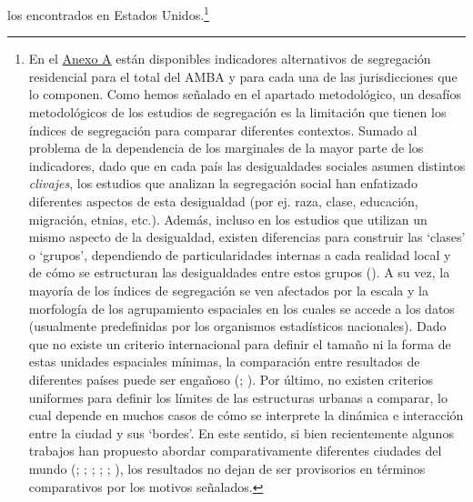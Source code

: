 \documentclass[
  spanish,
  a4paper,%
  chapterprefix=true,%
  DIV=calc,%
  twoside]{scrbook}%
\begin{document}
los encontrados en Estados Unidos.\footnote{En el \hyperref[appendixA]{Anexo A} están
  disponibles indicadores alternativos de segregación residencial para
  el total del AMBA y para cada una de las jurisdicciones que lo
  componen. Como hemos señalado en el apartado metodológico, un
  desafíos metodológicos de los estudios de segregación es la
  limitación que tienen los índices de segregación para comparar
  diferentes contextos. Sumado al problema de la dependencia de los
  marginales de la mayor parte de los indicadores, dado que en cada
  país las desigualdades sociales asumen distintos \emph{clivajes}, los
  estudios que analizan la segregación social han enfatizado
  diferentes aspectos de esta desigualdad (por ej. raza, clase,
  educación, migración, etnias, etc.). Además, incluso en los estudios
  que utilizan un mismo aspecto de la desigualdad, existen diferencias
  para construir las `clases' o `grupos', dependiendo de
  particularidades internas a cada realidad local y de cómo se
  estructuran las desigualdades entre estos grupos (). A
  su vez, la mayoría de los índices de segregación se ven afectados
  por la escala y la morfología de los agrupamiento espaciales en los
  cuales se accede a los datos (usualmente predefinidas por los
  organismos estadísticos nacionales). Dado que no existe un criterio
  internacional para definir el tamaño ni la forma de estas unidades
  espaciales mínimas, la comparación entre resultados de diferentes
  países puede ser engañoso (; ). Por
  último, no existen criterios uniformes para definir los límites de
  las estructuras urbanas a comparar, lo cual depende en muchos casos
  de cómo se interprete la dinámica e interacción entre la ciudad y
  sus `bordes'. En este sentido, si bien recientemente algunos
  trabajos han propuesto abordar comparativamente diferentes ciudades
  del mundo (; ; ; ; ; ), los resultados no dejan
  de ser provisorios en términos comparativos por los motivos
  señalados.}
\end{document}
